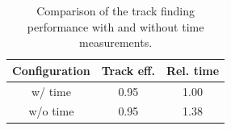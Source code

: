 %
% 

%
%

\begin{table}[ht]
    \centering
    \begin{tabular}{ccc}
        \hline
        \textbf{Configuration} & \textbf{Track eff.} & \textbf{Rel. time} \\
        \hline
        w/ time & 0.95 & 1.00 \\
        w/o time & 0.95 & 1.38 \\
        \hline
    \end{tabular}
    \caption{Comparison of the track finding performance with and without time measurements.}
    \label{tab:dev/4d-tracking/track-finding}
\end{table}

